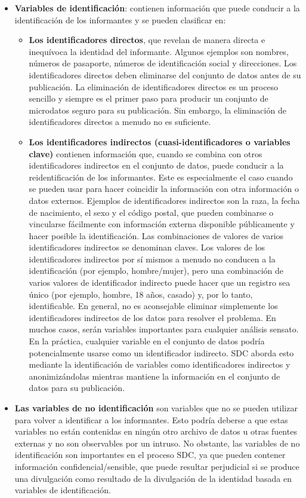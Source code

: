 \documentclass[
]{book}
\theoremstyle{definition}
\theoremstyle{definition}
\theoremstyle{definition}
\theoremstyle{definition}
\theoremstyle{remark}
\begin{document}
\begin{itemize}
\item
  \textbf{Variables de identificación}: contienen información que puede conducir a la identificación de los informantes y se pueden clasificar en:

  \begin{itemize}
  \item
    \textbf{Los identificadores directos}, que revelan de manera directa e inequívoca la identidad del informante. Algunos ejemplos son nombres, números de pasaporte, números de identificación social y direcciones. Los identificadores directos deben eliminarse del conjunto de datos antes de su publicación. La eliminación de identificadores directos es un proceso sencillo y siempre es el primer paso para producir un conjunto de microdatos seguro para su publicación. Sin embargo, la eliminación de identificadores directos a menudo no es suficiente.
  \item
    \textbf{Los identificadores indirectos (cuasi-identificadores o variables clave)} contienen información que, cuando se combina con otros identificadores indirectos en el conjunto de datos, puede conducir a la reidentificación de los informantes. Este es especialmente el caso cuando se pueden usar para hacer coincidir la información con otra información o datos externos. Ejemplos de identificadores indirectos son la raza, la fecha de nacimiento, el sexo y el código postal, que pueden combinarse o vincularse fácilmente con información externa disponible públicamente y hacer posible la identificación. Las combinaciones de valores de varios identificadores indirectos se denominan claves. Los valores de los identificadores indirectos por sí mismos a menudo no conducen a la identificación (por ejemplo, hombre/mujer), pero una combinación de varios valores de identificador indirecto puede hacer que un registro sea único (por ejemplo, hombre, 18 años, casado) y, por lo tanto, identificable. En general, no es aconsejable eliminar simplemente los identificadores indirectos de los datos para resolver el problema. En muchos casos, serán variables importantes para cualquier análisis sensato. En la práctica, cualquier variable en el conjunto de datos podría potencialmente usarse como un identificador indirecto. SDC aborda esto mediante la identificación de variables como identificadores indirectos y anonimizándolas mientras mantiene la información en el conjunto de datos para su publicación.
  \end{itemize}
\item
  \textbf{Las variables de no identificación} son variables que no se pueden utilizar para volver a identificar a los informantes. Esto podría deberse a que estas variables no están contenidas en ningún otro archivo de datos u otras fuentes externas y no son observables por un intruso. No obstante, las variables de no identificación son importantes en el proceso SDC, ya que pueden contener información confidencial/sensible, que puede resultar perjudicial si se produce una divulgación como resultado de la divulgación de la identidad basada en variables de identificación.
\end{itemize}
\end{document}
